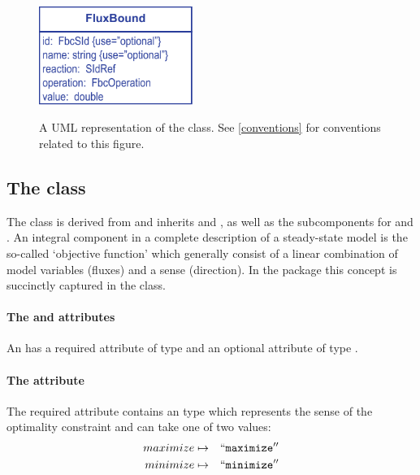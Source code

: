 \begin{figure}[h]
  \centering
  \includegraphics[width=5cm]{images/fbc_uml_fbnd.pdf}\\
  \caption{A UML representation of the \FBCPackage \FluxBound class. See
  \ref{conventions} for conventions related to this figure.}
  \label{fig:fbc_uml_fbnd}
\end{figure}


\subsection{The \FBC {} class}
\label{objective-class}
\label{listoffluxobjectives-class}

The \FBC \Objective class is derived from \SBML \SBase and inherits
 and , as well as the subcomponents for
\Annotation and \Notes. An integral component in a complete description
of a steady-state model is the so-called `objective function' which generally
consist of a linear combination of model variables (fluxes) and a sense
(direction). In the \FBC package this concept is succinctly captured in the
\Objective class.

\paragraph{The  and  attributes}
An \Objective has a required attribute  of type
 and an optional attribute  of type .

\paragraph{The  attribute}
The required  attribute contains an  type
which represents the sense of the optimality constraint and can take one of
two values:
\begin{eqnarray*}
\label{obj-type-enum}
 \nonumber
  maximize & \mapsto & ``\textcolor{black}{\textup{\ttfamily{maximize}}}''\\
  minimize & \mapsto & ``\textcolor{black}{\textup{\ttfamily{minimize}}}''
\end{eqnarray*}

